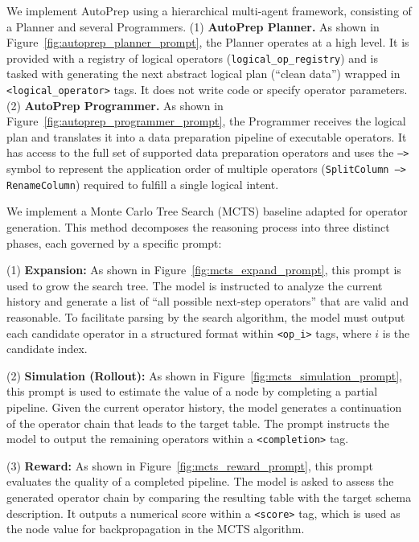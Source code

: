 We implement AutoPrep using a hierarchical multi-agent framework, consisting of a Planner and several Programmers.
(1) \textbf{AutoPrep Planner.} As shown in Figure~\ref{fig:autoprep_planner_prompt}, the Planner operates at a high level. It is provided with a registry of logical operators (\texttt{logical\_op\_registry}) and is tasked with generating the next abstract logical plan (\eg ``clean data'') wrapped in \texttt{<logical\_operator>} tags. It does not write code or specify operator parameters.
(2) \textbf{AutoPrep Programmer.} As shown in Figure~\ref{fig:autoprep_programmer_prompt}, the Programmer receives the logical plan and translates it into a data preparation pipeline of executable operators. It has access to the full set of supported data preparation operators and uses the \texttt{-->} symbol to represent the application order of multiple operators (\eg \texttt{SplitColumn --> RenameColumn}) required to fulfill a single logical intent.

We implement a Monte Carlo Tree Search (MCTS) baseline adapted for operator generation. This method decomposes the reasoning process into three distinct phases, each governed by a specific prompt:

(1) \textbf{Expansion:} As shown in Figure~\ref{fig:mcts_expand_prompt}, this prompt is used to grow the search tree. The model is instructed to analyze the current history and generate a list of ``all possible next-step operators'' that are valid and reasonable. To facilitate parsing by the search algorithm, the model must output each candidate operator in a structured format within \texttt{<op\_i>} tags, where $i$ is the candidate index.

(2) \textbf{Simulation (Rollout):} As shown in Figure~\ref{fig:mcts_simulation_prompt}, this prompt is used to estimate the value of a node by completing a partial pipeline. Given the current operator history, the model generates a continuation of the operator chain that leads to the target table. The prompt instructs the model to output the remaining operators within a \texttt{<completion>} tag.

(3) \textbf{Reward:} As shown in Figure~\ref{fig:mcts_reward_prompt}, this prompt evaluates the quality of a completed pipeline. The model is asked to assess the generated operator chain by comparing the resulting table with the target schema description. It outputs a numerical score within a \texttt{<score>} tag, which is used as the node value for backpropagation in the MCTS algorithm.
